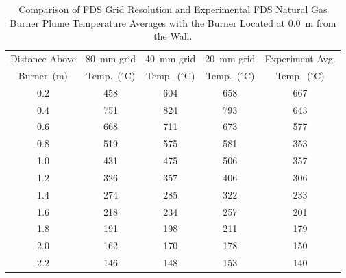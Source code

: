 \documentclass[twoside]{uocthesis}
\begin{document}
\begin{table}[ht!]
  \small
  \centering
  \begin{tabular}{|c|c|c|c|c|}
    \hline Distance Above  & 80~mm grid      & 40~mm grid     & 20~mm grid    & Experiment Avg. \\
    Burner~(m)     & Temp.~($^{\circ}$C) & Temp.~($^{\circ}$C) & Temp.~($^{\circ}$C)  & Temp.~($^{\circ}$C) \\ \hline
    \hline 0.2         & 458            & 604           & 658     & 667   \\
    \hline 0.4         & 751            & 824           & 793     & 643   \\
    \hline 0.6         & 668            & 711           & 673     & 577   \\
    \hline 0.8         & 519            & 575           & 581     & 353 \\
    \hline 1.0         & 431            & 475           & 506     & 357 \\
    \hline 1.2         & 326            & 357           & 406     & 306 \\
    \hline 1.4         & 274            & 285           & 322     & 233 \\
    \hline 1.6         & 218            & 234           & 257     & 201 \\
    \hline 1.8         & 191            & 198           & 211     & 179 \\
    \hline 2.0         & 162            & 170           & 178     & 150 \\
    \hline 2.2         & 146            & 148           & 153     & 140 \\
    \hline
  \end{tabular}
  \caption[Comparison of FDS Grid Resolution and Experimental FDS Natural Gas Burner Plume Temperatures, 0.0~m from the Wall.]{Comparison of FDS Grid Resolution and Experimental FDS Natural Gas Burner Plume Temperature Averages with the Burner Located at 0.0~m from the Wall.}
  \label{tab:FDSRI_Exp_Plume0d}
\end{table}
\end{document}
